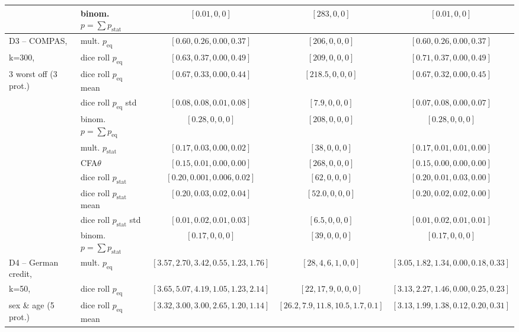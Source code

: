 \begin{table}[t!]
{\begin{tabular}{llccc}
			& binom. \algoFAIR $p = \sum p_{\text{stat}}$	& $[0.01,0,0]$		& $[283,0,0]$	& $[0.01,0,0]$ \\													
			\midrule
			\midrule
			D3 -- COMPAS, 		& mult. \algoFAIR  $p_{\text{eq}}$ 	& $[0.60, 0.26, 0.00, 0.37]$ 	& $[206, 0, 0, 0]$ 		& $[0.60, 0.26, 0.00, 0.37]$ \\
			k=300,				& dice roll $p_{\text{eq}}$ 	& $[0.63, 0.37, 0.00, 0.49]$ & $[209, 0, 0, 0]$ 	& $[0.71, 0.37, 0.00, 0.49]$ \\
			3 worst off (3 prot.)	& dice roll $p_{\text{eq}}$ mean	& $[0.67, 0.33, 0.00, 0.44]$ & $[218.5, 0, 0, 0]$ 	& $[0.67, 0.32, 0.00, 0.45]$ \\
			& dice roll $p_{\text{eq}}$ std	& $[0.08, 0.08, 0.01, 0.08]$ & $[7.9, 0, 0, 0]$ 	& $[0.07, 0.08, 0.00, 0.07]$ \\
			& binom. \algoFAIR $p = \sum p_{\text{eq}}$	& $[0.28,0,0, 0]$		& $[208,0,0, 0]$		& $[0.28,0,0, 0]$  \\
			\cline{2-5}
			& mult. \algoFAIR  $p_{\text{stat}}$ 	& $[0.17, 0.03, 0.00, 0.02]$ & $[38, 0, 0, 0]$ 				& $[0.17, 0.01,0.01, 0.00] $  \\
			& CFA$\theta$ 					& $[0.15, 0.01, 0.00, 0.00] $ & $[268, 0, 0, 0]$ 	& $[0.15, 0.00, 0.00, 0.00]$   \\
			& dice roll $p_{\text{stat}}$ 	& $[0.20, 0.001, 0.006, 0.02]$ & $[62, 0, 0, 0]$ 		& $[0.20, 0.01, 0.03, 0.00]$ \\
			& dice roll $p_{\text{stat}}$ mean	& $[0.20, 0.03, 0.02, 0.04]$ & $[52.0, 0, 0, 0]$ 		& $[0.20, 0.02, 0.02, 0.00]$ \\
			& dice roll $p_{\text{stat}}$ std	& $[0.01, 0.02, 0.01, 0.03]$ & $[6.5, 0, 0, 0]$ 		& $[0.01, 0.02, 0.01, 0.01]$ \\
			& binom. \algoFAIR $p = \sum p_{\text{stat}}$	& $[0.17,0,0, 0]$		& $[39,0,0, 0]$		& $[0.17,0,0, 0]$  \\												
			\midrule
			\midrule
			D4 -- German credit, 	& mult. \algoFAIR $p_{\text{eq}}$ 	&  $[3.57, 2.70, 3.42, 0.55, 1.23, 1.76]$ 	& $[28, 4, 6, 1, 0, 0]$ 	& $[3.05, 1.82, 1.34, 0.00, 0.18, 0.33]$ \\
			k=50,					& dice roll $p_{\text{eq}}$ 	& $[3.65, 5.07, 4.19, 1.05, 1.23, 2.14]$ & $[22, 17, 9, 0, 0, 0]$ 	& $[3.13, 2.27, 1.46, 0.00, 0.25, 0.23]$ \\
			sex \& age (5 prot.)	& dice roll $p_{\text{eq}}$ mean	& $[3.32, 3.00, 3.00, 2.65, 1.20, 1.14]$ & $[26.2, 7.9, 11.8, 10.5, 1.7, 0.1]$ 	& $[3.13, 1.99, 1.38, 0.12, 0.20, 0.31]$ \\

\end{tabular}}
\end{table}
